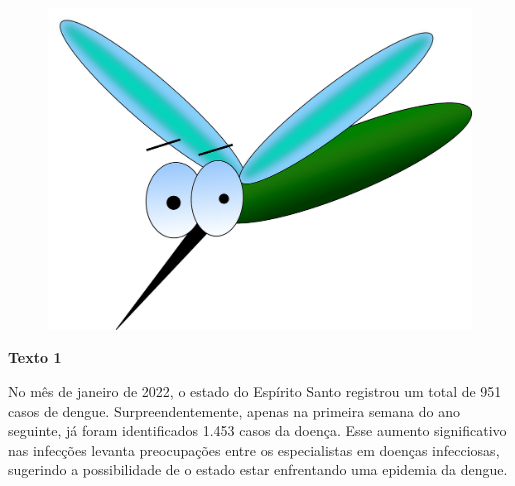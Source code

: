 \begin{myquote}





\begin{figure}[H]
\centering
\includegraphics[scale=0.15]{./imgSAEB_7_POR/media/image32.png}
\end{figure}

\textbf{Texto 1}

No mês de janeiro de 2022, o estado do Espírito Santo registrou um
total de 951 casos de dengue. Surpreendentemente, apenas na primeira semana do
ano seguinte, já foram identificados 1.453 casos da doença. Esse aumento
significativo nas infecções levanta preocupações entre os especialistas em
doenças infecciosas, sugerindo a possibilidade de o estado estar enfrentando
uma epidemia da dengue.


\end{myquote}
